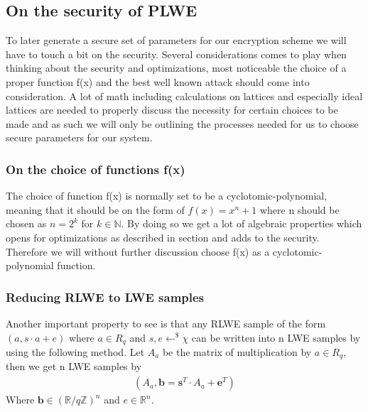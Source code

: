 \documentclass[../main.tex]{subfiles}
\begin{document}
\subsection{On the security of PLWE}
    To later generate a secure set of parameters for our encryption scheme we will have to touch a bit on the security.
    Several considerations comes to play when thinking about the security and optimizations, most noticeable the choice
    of a proper function f(x) and the best well known attack should come into consideration.
    A lot of math including calculations on lattices and especially ideal lattices are needed to properly discuss the
    necessity for certain choices to be made and as such we will only be outlining the processes needed for us to choose
    secure parameters for our system.

    \subsubsection{On the choice of functions f(x)}
        The choice of function f(x) is normally set to be a cyclotomic-polynomial, meaning that it should be on the form
        of $f(x) = x^n + 1$ where n should be chosen as $n = 2^k$ for $k \in \mathbb{N}$.
        By doing so we get a lot of algebraic properties which opens for optimizations as described in section %
        and adds to the security.
        Therefore we will without further discussion choose f(x) as a cyclotomic-polynomial function.

    \subsubsection{Reducing RLWE to LWE samples}
        Another important property to see is that any RLWE sample of the form $(a, s \cdot a + e)$ 
		where $a \in R_q$ and $s, e \leftarrow^\$ \chi$ can be written into n LWE samples by using the following method.
        Let $A_a$ be the matrix of multiplication by $a \in R_q$, then we get n LWE samples by
        \begin{align*}
            (A_a, \textbf{b} = \textbf{s}^T \cdot A_a + \textbf{e}^T)
        \end{align*}
        Where $\textbf{b} \in (\mathbb{R} / q\mathbb{Z})^n$ and $e \in \mathbb{R}^n$.
\end{document}
